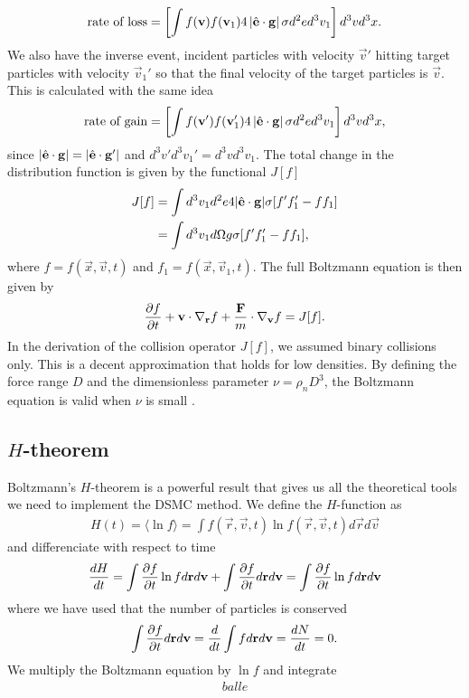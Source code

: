 \begin{align}
	\text{rate of loss} = \left[\int f(\mathbf v)f(\mathbf v_1)4\left|\hat {\mathbf{e}} \cdot \mathbf g \right|\sigma d^2 ed^3 v_1\right]d^3 vd^3 x.
\end{align}
We also have the inverse event, incident particles with velocity $\vec v'$ hitting target particles with velocity $\vec v_1'$ so that the final velocity of the target particles is $\vec v$. This is calculated with the same idea
\begin{align}
	\text{rate of gain} = \left[\int f(\mathbf v')f(\mathbf v_1')4\left|\hat {\mathbf{e}} \cdot \mathbf g \right|\sigma d^2 ed^3 v_1\right]d^3 vd^3 x,
\end{align}
since $|\hat {\mathbf{e}}\cdot \mathbf g| = |\hat {\mathbf{e}}\cdot \mathbf g'|$ and $d^3 v'd^3 v_1' = d^3 vd^3 v_1$. The total change in the distribution function is given by the functional $J[f]$
\begin{align}
	J[f] &= \int d^3 v_1 d^2 e4|\hat {\mathbf{e}}\cdot\mathbf g|\sigma[f'f_1' - ff_1]\\
	&= \int d^3 v_1 d\Omega g \sigma[f'f_1' - ff_1],
\end{align}
where $f = f(\vec x, \vec v, t)$ and $f_1 = f(\vec x, \vec v_1, t)$. The full Boltzmann equation is then given by
\begin{align}
	\label{eq:boltzmann_equation}
	\frac{\partial f}{\partial t} + \mathbf v\cdot \nabla_\mathbf r f + {\mathbf F\over m}\cdot\nabla_\mathbf v f = J[f].
\end{align}
In the derivation of the collision operator $J[f]$, we assumed binary collisions only. This is a decent approximation that holds for low densities. By defining the force range $D$ and the dimensionless parameter $\nu = \rho_n D^3$, the Boltzmann equation is valid when $\nu$ is small \cite{mclennan1989introduction}. 
\subsection{$H$-theorem}
Boltzmann's $H$-theorem is a powerful result that gives us all the theoretical tools we need to implement the DSMC method. We define the $H$-function as
\begin{align}
	H(t) = \langle \ln f \rangle = \int f(\vec r, \vec v, t)\ln f(\vec r, \vec v, t)d\vec r d\vec v
\end{align}
and differenciate with respect to time
\begin{align}
	\frac{dH}{dt} = \int \frac{\partial f}{\partial t}\ln f d\mathbf r d\mathbf v + \int \frac{\partial f}{\partial t} d\mathbf r d\mathbf v = \int \frac{\partial f}{\partial t}\ln f d\mathbf r d\mathbf v
\end{align}
where we have used that the number of particles is conserved
\begin{align}
	\int \frac{\partial f}{\partial t}d\mathbf r d\mathbf v = \frac{d}{dt} \int fd\mathbf r d\mathbf v = \frac{dN}{dt} = 0.
\end{align}
We multiply the Boltzmann equation by $\ln f$ and integrate
\begin{align}
	balle
\end{align}

